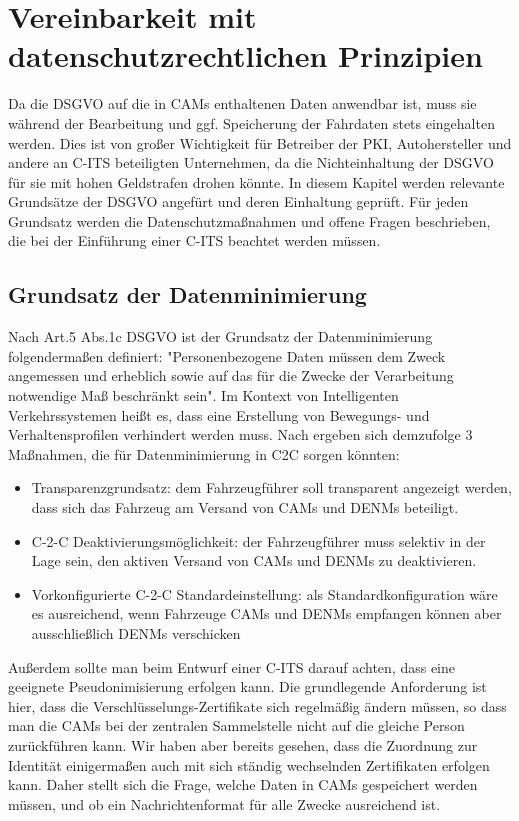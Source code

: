 \section{Vereinbarkeit mit datenschutzrechtlichen Prinzipien}
\label{ch:SecondContentSection}

Da die DSGVO auf die in CAMs enthaltenen Daten anwendbar ist, muss sie während der Bearbeitung und ggf. Speicherung der Fahrdaten stets eingehalten werden. Dies ist von großer Wichtigkeit für Betreiber der PKI, Autohersteller und andere an C-ITS beteiligten Unternehmen, da die Nichteinhaltung der DSGVO für sie mit hohen Geldstrafen drohen könnte. In diesem Kapitel werden relevante Grundsätze der DSGVO angefürt und deren Einhaltung geprüft. Für jeden Grundsatz werden die Datenschutzmaßnahmen und offene Fragen beschrieben, die bei der Einführung einer C-ITS beachtet werden müssen. 

\subsection{Grundsatz der Datenminimierung}

Nach Art.5 Abs.1c DSGVO ist der Grundsatz der Datenminimierung folgendermaßen definiert: "Personenbezogene Daten müssen dem Zweck angemessen und erheblich sowie auf das für die Zwecke der Verarbeitung notwendige Maß beschränkt sein". Im Kontext von Intelligenten Verkehrssystemen heißt es, dass eine Erstellung von Bewegungs- und Verhaltensprofilen verhindert werden muss. Nach \cite{Kiometzis2017} ergeben sich demzufolge 3 Maßnahmen, die für Datenminimierung in C2C sorgen könnten:
\begin{itemize}
	\item Transparenzgrundsatz: dem Fahrzeugführer soll transparent angezeigt werden, dass sich das Fahrzeug am Versand von CAMs und DENMs beteiligt. 
	\item C-2-C Deaktivierungsmöglichkeit: der Fahrzeugführer muss selektiv in der Lage sein, den aktiven Versand von CAMs und DENMs zu deaktivieren.
	\item Vorkonfigurierte C-2-C Standardeinstellung: als Standardkonfiguration wäre es ausreichend, wenn Fahrzeuge CAMs und DENMs empfangen können aber ausschließlich DENMs verschicken
\end{itemize}

Außerdem sollte man beim Entwurf einer C-ITS darauf achten, dass eine geeignete Pseudonimisierung erfolgen kann. Die grundlegende Anforderung ist hier, dass die Verschlüsselungs-Zertifikate sich regelmäßig ändern müssen, so dass man die CAMs bei der zentralen Sammelstelle nicht auf die gleiche Person zurückführen kann. Wir haben aber bereits gesehen, dass die Zuordnung zur Identität einigermaßen auch mit sich ständig wechselnden Zertifikaten erfolgen kann. Daher stellt sich die Frage, welche Daten in CAMs gespeichert werden müssen, und ob ein Nachrichtenformat für alle Zwecke ausreichend ist.

